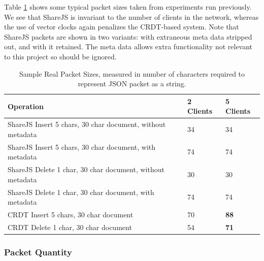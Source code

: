\documentclass[12pt,a4paper,twoside,openright]{report}
\begin{document}
			Table \ref{tab:samplepacketsizes} shows some typical packet sizes taken from experiments run previously. We see that ShareJS is invariant to the number of clients in the network, whereas the use of vector clocks again penalizes the CRDT-based system. Note that ShareJS packets are shown in two variants: with extraneous meta data stripped out, and with it retained. The meta data allows extra functionality not relevant to this project so should be ignored.
			
			\begin{table}[H]
			\centering
			\caption[Sample Packet Sizes]{Sample Real Packet Sizes, measured in number of characters required to represent JSON packet as a string.}
			\label{tab:samplepacketsizes}
			\setlength{\tabcolsep}{12pt}
			\begin{tabular}{@{}lll@{}}
			Operation													   & 2 Clients & 5 Clients \\ \toprule
			ShareJS Insert 5 chars, 30 char document, without metadata & 34        & 34        \\ \midrule
			ShareJS Insert 5 chars, 30 char document, with metadata    & 74        & 74        \\ \midrule
			ShareJS Delete 1 char, 30 char document, without metadata  & 30        & 30        \\ \midrule
			ShareJS Delete 1 char, 30 char document, with metadata      & 74        & 74       \\ \midrule
			CRDT Insert 5 chars, 30 char document                      & 70        & \textbf{88}        \\ \midrule
			CRDT Delete 1 char, 30 char document                  & 54        & \textbf{71}        \\ \bottomrule

			\end{tabular}
			\end{table}
			
			
			
		\subsubsection{Packet Quantity}
		
\end{document}
